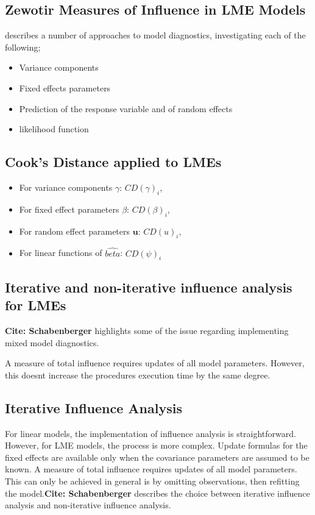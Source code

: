 \subsection{Zewotir Measures of Influence in LME Models}%
\citet{Zewotir} describes a number of approaches to model diagnostics, investigating each of the following;
\begin{itemize}
\item Variance components
\item Fixed effects parameters
\item Prediction of the response variable and of random effects
\item likelihood function
\end{itemize}

\subsection{Cook's Distance applied to LMEs}
\begin{itemize}
\item For variance components $\gamma$: $CD(\gamma)_i$,
\item For fixed effect parameters $\beta$: $CD(\beta)_i$,
\item For random effect parameters $\boldsymbol{u}$: $CD(u)_i$,
\item For linear functions of $\hat{beta}$: $CD(\psi)_i$
\end{itemize}

\subsection{Iterative and non-iterative influence analysis for LMEs} %

\textbf{Cite: Schabenberger} highlights some of the issue regarding implementing mixed model diagnostics.

A measure of total influence requires updates of all model parameters. However, this doesnt increase the procedures execution time by the same degree.

\subsection{Iterative Influence Analysis}

For linear models, the implementation of influence analysis is straightforward.
However, for LME models, the process is more complex. Update formulas for the fixed effects are available only when the covariance parameters are assumed to be known. A measure of total influence requires updates of all model parameters. This can only be achieved in general is by omitting observations, then refitting the model.\textbf{Cite: Schabenberger} describes the choice between  iterative influence analysis and  non-iterative influence analysis.



